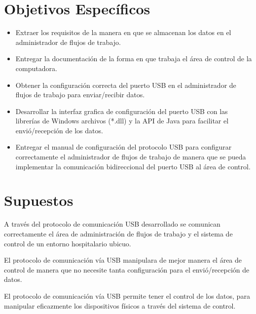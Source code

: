 \vspace{0.2cm}

\section{Objetivos Específicos}

\begin{itemize}
    \item Extraer los requisitos de la manera en que se almacenan los datos en el administrador de flujos de trabajo.
    \item Entregar la documentación de la forma en que trabaja el área de control de la computadora.
    \item Obtener la configuración correcta del puerto USB en el administrador de flujos de trabajo para enviar/recibir datos.
    \item Desarrollar la interfaz grafica de configuración del puerto USB con las librerías de Windows archivos (*.dll) y la API de Java para facilitar el envió/recepción de los datos.
    \item Entregar el manual de configuración del protocolo USB para configurar correctamente el administrador de flujos de trabajo de manera que se pueda implementar la comunicación bidireccional del puerto USB al área de control.
\end{itemize}

\section{Supuestos}

A través del protocolo de comunicación USB desarrollado se
comunican correctamente el área de administración de flujos de
trabajo y el sistema de control de un entorno hospitalario
ubicuo.\\

\vspace{0.1cm}

El protocolo de comunicación vía USB manipulara de mejor manera el
área de control de manera que no necesite tanta configuración para
el envió/recepción de datos.\\

\vspace{0.1cm}

El protocolo de comunicación vía USB permite tener el control de
los datos, para manipular eficazmente los dispositivos físicos a
través del sistema de control.\\

